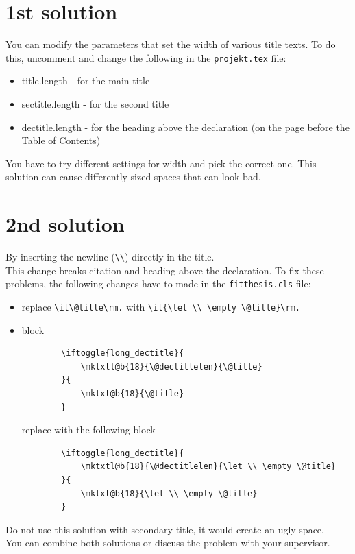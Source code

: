 \section{1st solution}
You can modify the parameters that set the width of various title texts. To do this, uncomment and change the following in the  \texttt{projekt.tex} file:
\begin{itemize}
	\item title.length - for the main title
	\item sectitle.length - for the second title
	\item dectitle.length - for the heading above the declaration (on the page before the Table of Contents)  
\end{itemize}

You have to try different settings for width and pick the correct one. This solution can cause differently sized spaces that can look bad.

\section{2nd solution}
By inserting the newline (\verb|\\|) directly in the title. \\

This change breaks citation and heading above the declaration. To fix these problems, the following changes have to made in the \texttt{fitthesis.cls} file:
\begin{itemize}
	\item replace \verb|\it\@title\rm.| with \verb|\it{\let \\ \empty \@title}\rm.|
	\item block
	\begin{verbatim}		\iftoggle{long_dectitle}{
			\mktxtl@b{18}{\@dectitlelen}{\@title}
		}{
			\mktxt@b{18}{\@title}
		}		
	\end{verbatim}
	replace with the following block
	\begin{verbatim}
		\iftoggle{long_dectitle}{
			\mktxtl@b{18}{\@dectitlelen}{\let \\ \empty \@title}
		}{
			\mktxt@b{18}{\let \\ \empty \@title}
		}
	\end{verbatim}
\end{itemize}
Do not use this solution with secondary title, it would create an ugly space.
\\ \noindent You can combine both solutions or discuss the problem with your supervisor.

